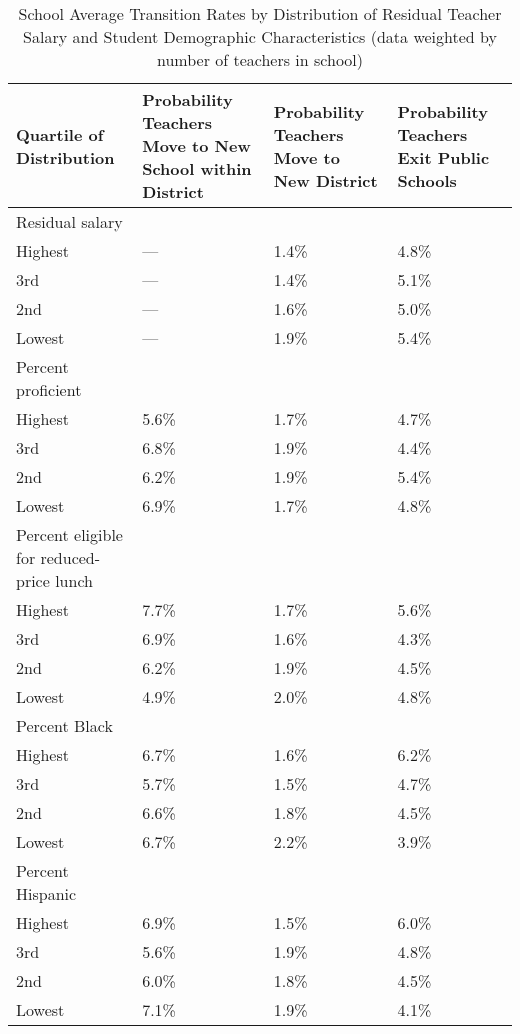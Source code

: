 \documentclass[]{article}
\begin{document}
\begin{table}[ht]
\centering
\begin{tabular}{p{}p{}p{}p{}}
  \hline
Quartile of Distribution & Probability Teachers Move to New School within District & Probability Teachers Move to New District & Probability Teachers Exit Public Schools \\ 
  \hline
Residual salary & & & \\
\quad Highest & --- & 1.4\% & 4.8\% \\ 
  \quad 3rd & --- & 1.4\% & 5.1\% \\ 
  \quad 2nd & --- & 1.6\% & 5.0\% \\ 
  \quad Lowest & --- & 1.9\% & 5.4\% \\ 
Percent proficient & & & \\
  \quad Highest & 5.6\% & 1.7\% & 4.7\% \\ 
  \quad 3rd & 6.8\% & 1.9\% & 4.4\% \\ 
  \quad 2nd & 6.2\% & 1.9\% & 5.4\% \\ 
  \quad Lowest & 6.9\% & 1.7\% & 4.8\% \\ 
Percent eligible for reduced-price lunch & & & \\
  \quad Highest & 7.7\% & 1.7\% & 5.6\% \\ 
  \quad 3rd & 6.9\% & 1.6\% & 4.3\% \\ 
  \quad 2nd & 6.2\% & 1.9\% & 4.5\% \\ 
  \quad Lowest & 4.9\% & 2.0\% & 4.8\% \\ 
Percent Black & & & \\
  \quad Highest & 6.7\% & 1.6\% & 6.2\% \\ 
  \quad 3rd & 5.7\% & 1.5\% & 4.7\% \\ 
  \quad 2nd & 6.6\% & 1.8\% & 4.5\% \\ 
  \quad Lowest & 6.7\% & 2.2\% & 3.9\% \\ 
Percent Hispanic & & & \\
  \quad Highest & 6.9\% & 1.5\% & 6.0\% \\ 
  \quad 3rd & 5.6\% & 1.9\% & 4.8\% \\ 
  \quad 2nd & 6.0\% & 1.8\% & 4.5\% \\ 
  \quad Lowest & 7.1\% & 1.9\% & 4.1\% \\ 
   \hline
\end{tabular}
\caption{School Average Transition Rates by Distribution of Residual Teacher Salary and Student Demographic Characteristics (data weighted by number of teachers in school)} 
\label{tbl:change_by_quartile}
\end{table}
\end{document}
